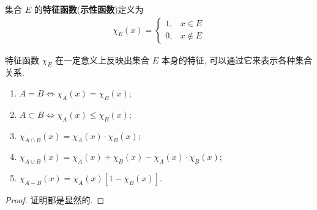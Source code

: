 \documentclass[../../main.tex]{subfiles}
\begin{document}
\begin{definition}
集合 $E$ 的\textbf{特征函数}(\textbf{示性函数})定义为
\begin{align*}
\chi_E(x) = 
\begin{cases}
1, & x \in E\\
0, & x \notin E
\end{cases}
\end{align*}
\end{definition}
\begin{note}
特征函数 $\chi_E$ 在一定意义上反映出集合 $E$ 本身的特征, 可以通过它来表示各种集合关系.
\end{note}

\begin{proposition}[特征函数的基本性质]\label{proposition:特征函数的基本性质}
\begin{enumerate}[(1)]
\item  $A = B \Leftrightarrow \chi_A(x) = \chi_B(x)$; 
\item $A \subset B \Leftrightarrow \chi_A(x) \leqslant \chi_B(x)$;
\item $\chi_{A \cap B}(x) = \chi_A(x) \cdot \chi_B(x)$;
\item $\chi_{A \cup B}(x) = \chi_A(x) + \chi_B(x) - \chi_A(x) \cdot \chi_B(x)$;
\item $\chi_{A - B}(x) = \chi_A(x)[1 - \chi_B(x)]$.
\end{enumerate} 
\end{proposition}
\begin{proof}
证明都是显然的.
\end{proof}
\end{document}
